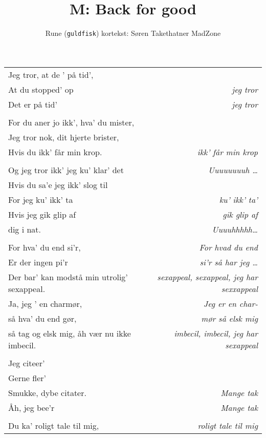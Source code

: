 \documentclass[danish]{article}
\title{M: Back for good}
\author{Rune (\texttt{guldfisk}) kortekst: Søren Takethatner MadZone}
\begin{document}
\twocolumn[ %
\maketitle
]

\begin{tabular}{lr}
Jeg tror, at de ' på tid', & \\
At du stopped' op & \em{jeg tror}\\
Det er på tid' & \em{jeg tror}\\
 & \\
For du aner jo ikk', hva' du mister, & \\
Jeg tror nok, dit hjerte brister, & \\
Hvis du ikk' får min krop. & \em{ikk' får min krop}\\
 & \\
Og jeg tror ikk' jeg ku' klar' det & \em{Uuuuuuuuh \ldots}\\
Hvis du sa'e jeg ikk' slog til & \\
For jeg ku' ikk' ta & \em{ku' ikk' ta'}\\
Hvis jeg gik glip af & \em{gik glip af}\\
dig i nat. & \em{Uuuuhhhhh}\ldots\\
 & \\
For hva' du end si'r, & \em{For hvad du end}\\
Er der ingen pi'r & \hspace{1cm}\em{si'r så har jeg \ldots}\\
Der bar' kan modstå min utrolig' sexappeal. & \em{sexappeal, sexappeal,
  jeg har sexxappeal}\\
Ja, jeg ' en charmør, &  \em{Jeg er en char-}\\
så hva' du end gør, & \hspace{1cm}\em{mør så elsk mig}\\
så tag og elsk mig, åh vær nu ikke imbecil. & \em{imbecil, imbecil, jeg har
  sexappeal}\\
 & \\
Jeg citeer' & \\
Gerne fler' & \\
Smukke, dybe citater. & \em{Mange tak}\\
Åh, jeg bee'r & \em{Mange tak}\\
 & \\
Du ka' roligt tale til mig, & \em{roligt tale til mig}\\

\end{tabular}
\end{document}
